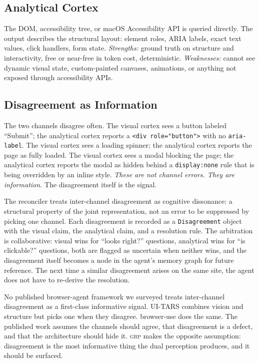 \documentclass[12pt]{article}
\theoremstyle{definition}
\theoremstyle{remark}
\newcommand{\grp}{\textsc{grp}}
\begin{document}
\subsection{Analytical Cortex}
The DOM, accessibility tree, or macOS Accessibility API is queried
directly. The output describes the structural layout: element roles,
ARIA labels, exact text values, click handlers, form state.
\emph{Strengths:} ground truth on structure and interactivity, free
or near-free in token cost, deterministic. \emph{Weaknesses:} cannot
see dynamic visual state, custom-painted canvases, animations, or
anything not exposed through accessibility APIs.

\subsection{Disagreement as Information}
The two channels disagree often. The visual cortex sees a button
labeled ``Submit''; the analytical cortex reports a
\texttt{<div role="button">} with no \texttt{aria-label}. The visual
cortex sees a loading spinner; the analytical cortex reports the page
as fully loaded. The visual cortex sees a modal blocking the page;
the analytical cortex reports the modal as hidden behind a
\texttt{display:none} rule that is being overridden by an inline
style. \emph{These are not channel errors. They are information.}
The disagreement itself is the signal.

The reconciler treats inter-channel disagreement as cognitive
dissonance: a structural property of the joint representation, not an
error to be suppressed by picking one channel. Each disagreement is
recorded as a \texttt{Disagreement} object with the visual claim, the
analytical claim, and a resolution rule. The arbitration is
collaborative: visual wins for ``looks right?'' questions, analytical
wins for ``is clickable?'' questions, both are flagged as uncertain
when neither wins, and the disagreement itself becomes a node in the
agent's memory graph for future reference. The next time a similar
disagreement arises on the same site, the agent does not have to
re-derive the resolution.

No published browser-agent framework we surveyed treats inter-channel
disagreement as a first-class informative signal. UI-TARS combines
vision and structure but picks one when they disagree. browser-use
does the same. The published work assumes the channels should agree,
that disagreement is a defect, and that the architecture should hide
it. \grp{} makes the opposite assumption: disagreement is the most
informative thing the dual perception produces, and it should be
surfaced.
\end{document}

